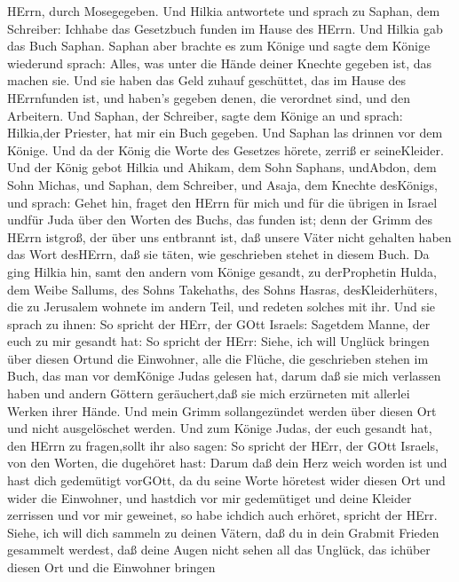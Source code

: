 HErrn, durch Mosegegeben.  Und Hilkia antwortete und sprach
zu Saphan, dem Schreiber: Ichhabe das Gesetzbuch funden im Hause des
HErrn. Und Hilkia gab das Buch Saphan.  Saphan aber brachte
es zum Könige und sagte dem Könige wiederund sprach: Alles, was unter
die Hände deiner Knechte gegeben ist, das machen sie.  Und
sie haben das Geld zuhauf geschüttet, das im Hause des HErrnfunden ist,
und haben's gegeben denen, die verordnet sind, und den Arbeitern.
 Und Saphan, der Schreiber, sagte dem Könige an und sprach:
Hilkia,der Priester, hat mir ein Buch gegeben. Und Saphan las drinnen
vor dem Könige.  Und da der König die Worte des Gesetzes
hörete, zerriß er seineKleider.  Und der König gebot Hilkia
und Ahikam, dem Sohn Saphans, undAbdon, dem Sohn Michas, und Saphan, dem
Schreiber, und Asaja, dem Knechte desKönigs, und sprach: 
Gehet hin, fraget den HErrn für mich und für die übrigen in Israel
undfür Juda über den Worten des Buchs, das funden ist; denn der Grimm
des HErrn istgroß, der über uns entbrannt ist, daß unsere Väter nicht
gehalten haben das Wort desHErrn, daß sie täten, wie geschrieben stehet
in diesem Buch.  Da ging Hilkia hin, samt den andern vom
Könige gesandt, zu derProphetin Hulda, dem Weibe Sallums, des Sohns
Takehaths, des Sohns Hasras, desKleiderhüters, die zu Jerusalem wohnete
im andern Teil, und redeten solches mit ihr.  Und sie
sprach zu ihnen: So spricht der HErr, der GOtt Israels: Sagetdem Manne,
der euch zu mir gesandt hat:  So spricht der HErr: Siehe,
ich will Unglück bringen über diesen Ortund die Einwohner, alle die
Flüche, die geschrieben stehen im Buch, das man vor demKönige Judas
gelesen hat,  darum daß sie mich verlassen haben und andern
Göttern geräuchert,daß sie mich erzürneten mit allerlei Werken ihrer
Hände. Und mein Grimm sollangezündet werden über diesen Ort und nicht
ausgelöschet werden.  Und zum Könige Judas, der euch
gesandt hat, den HErrn zu fragen,sollt ihr also sagen: So spricht der
HErr, der GOtt Israels, von den Worten, die dugehöret hast:
 Darum daß dein Herz weich worden ist und hast dich
gedemütigt vorGOtt, da du seine Worte höretest wider diesen Ort und
wider die Einwohner, und hastdich vor mir gedemütiget und deine Kleider
zerrissen und vor mir geweinet, so habe ichdich auch erhöret, spricht
der HErr.  Siehe, ich will dich sammeln zu deinen Vätern,
daß du in dein Grabmit Frieden gesammelt werdest, daß deine Augen nicht
sehen all das Unglück, das ichüber diesen Ort und die Einwohner bringen
